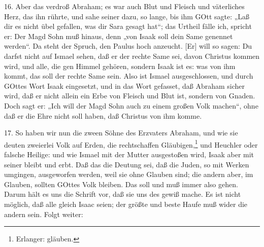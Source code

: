 16. Aber das verdroß Abraham; es war auch Blut und Fleisch und väterliches Herz, das ihn rührte, und sahe seiner dazu, so lange, bis ihm GOtt sagte: „Laß dir es nicht übel gefallen, was dir Sara gesagt hat“; das Urtheil fälle ich, spricht er: Der Magd Sohn muß hinaus, denn „von Isaak soll dein Same genennet werden“. Da steht der Spruch, den Paulus hoch anzeucht. [Er] will so sagen: Du darfst nicht auf Ismael sehen, daß er der rechte Same sei, davon Christus kommen wird, und alle, die gen Himmel gehören, sondern Isaak ist es: was von ihm kommt, das soll der rechte Same sein. Also ist Ismael ausgeschlossen, und durch GOttes Wort Isaak eingesetzt, und in das Wort gefasset, daß Abraham sicher wird, daß er nicht allein ein Erbe von Fleisch und Blut ist, sondern von Gnaden. Doch sagt er: „Ich will der Magd Sohn auch zu einem großen Volk machen“, ohne daß er die Ehre nicht soll haben, daß Christus von ihm komme.

17. So haben wir nun die zween Söhne des Erzvaters Abraham, und wie sie deuten zweierlei Volk auf Erden, die rechtschaffen Gläubigen,\footnote{Erlanger: gläuben.} und Heuchler oder falsche Heilige: und wie Ismael mit der Mutter ausgestoßen wird, Isaak aber mit seiner bleibt und erbt. Daß das die Deutung sei, daß die Juden, so mit Werken umgingen, ausgeworfen werden, weil sie ohne Glauben sind; die andern aber, im Glauben, sollten GOttes Volk bleiben. Das soll und muß immer also gehen. Darum hält es uns die Schrift vor, daß sie uns des gewiß mache. Es ist nicht
möglich, daß alle gleich Isaac seien; der größte und beste Haufe muß wider die andern sein. Folgt weiter:

